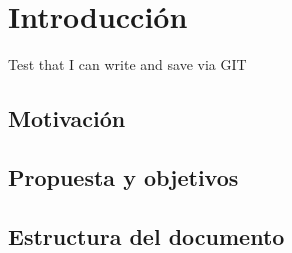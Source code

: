 \chapter{Introducción}\label{chap:introduccion}
Test that I can write and save via GIT

\section{Motivación}

\section{Propuesta y objetivos}

\section{Estructura del documento}

